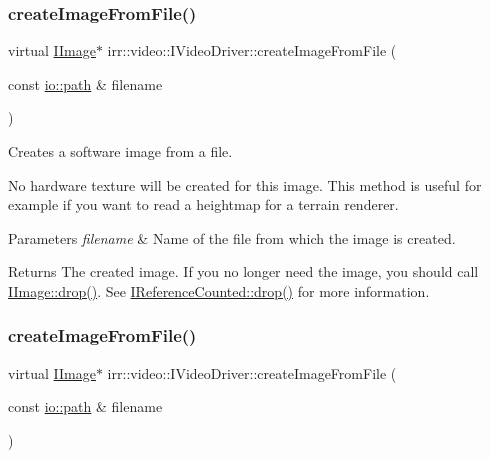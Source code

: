 \subsubsection{\texorpdfstring{create\+Image\+From\+File()}{createImageFromFile()}\hspace{0.1cm}{\footnotesize\ttfamily [1/4]}}
{\footnotesize\ttfamily virtual \hyperlink{classirr_1_1video_1_1IImage}{I\+Image}$\ast$ irr\+::video\+::\+I\+Video\+Driver\+::create\+Image\+From\+File (\begin{DoxyParamCaption}\item[{const \hyperlink{namespaceirr_1_1io_a6468281622ce3a1c46b72e19f32dded5}{io\+::path} \&}]{filename }\end{DoxyParamCaption})\hspace{0.3cm}{\ttfamily [pure virtual]}}



Creates a software image from a file. 

No hardware texture will be created for this image. This method is useful for example if you want to read a heightmap for a terrain renderer. 
\begin{DoxyParams}{Parameters}
{\em filename} & Name of the file from which the image is created. \\
\hline
\end{DoxyParams}
\begin{DoxyReturn}{Returns}
The created image. If you no longer need the image, you should call \hyperlink{classirr_1_1IReferenceCounted_a03856a09355b89d178090c4a5f738543}{I\+Image\+::drop()}. See \hyperlink{classirr_1_1IReferenceCounted_a03856a09355b89d178090c4a5f738543}{I\+Reference\+Counted\+::drop()} for more information. 
\end{DoxyReturn}
\mbox{\label{classirr_1_1video_1_1IVideoDriver_ac5b4c13f64d96d27fa27f52b68f77b8c}} 
\subsubsection{\texorpdfstring{create\+Image\+From\+File()}{createImageFromFile()}\hspace{0.1cm}{\footnotesize\ttfamily [2/4]}}
{\footnotesize\ttfamily virtual \hyperlink{classirr_1_1video_1_1IImage}{I\+Image}$\ast$ irr\+::video\+::\+I\+Video\+Driver\+::create\+Image\+From\+File (\begin{DoxyParamCaption}\item[{const \hyperlink{namespaceirr_1_1io_a6468281622ce3a1c46b72e19f32dded5}{io\+::path} \&}]{filename }\end{DoxyParamCaption})\hspace{0.3cm}{\ttfamily [pure virtual]}}



